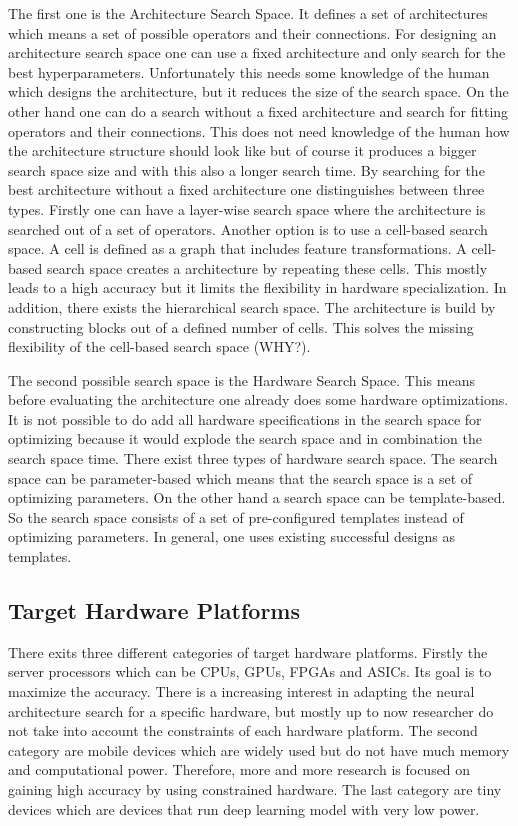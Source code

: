 \documentclass[conference]{IEEEtran}
\begin{document}
The first one is the Architecture Search Space. It defines a set of architectures which means a set of possible operators and their connections. For designing an architecture search space one can use a fixed architecture and only search for the best hyperparameters. Unfortunately this needs some knowledge of the human which designs the architecture, but it reduces the size of the search space. On the other hand one can do a search without a fixed architecture and search for fitting operators and their connections. This does not need knowledge of the human how the architecture structure should look like but of course it produces a bigger search space size and with this also a longer search time. By searching for the best architecture without a fixed architecture one distinguishes between three types. Firstly one can have a layer-wise search space where the architecture is searched out of a set of operators. Another option is to use a cell-based search space. A cell is defined as a graph that includes feature transformations. A cell-based search space creates a architecture by repeating these cells. This mostly leads to a high accuracy but it limits the flexibility in hardware specialization. In addition, there exists the hierarchical search space. The architecture is build by constructing blocks out of a defined number of cells. This solves the missing flexibility of the cell-based search space (WHY?). 

The second possible search space is the Hardware Search Space. This means before evaluating the architecture one already does some hardware optimizations. It is not possible to do add all hardware specifications in the search space for optimizing because it would explode the search space and in combination the search space time. There exist three types of hardware search space. The search space can be parameter-based which means that the search space is a set of optimizing parameters. On the other hand a search space can be template-based. So the search space consists of a set of pre-configured templates instead of optimizing parameters. In general, one uses existing successful designs as templates.

\subsection{Target Hardware Platforms}
There exits three different categories of target hardware platforms. Firstly the server processors which can be CPUs, GPUs, FPGAs and ASICs. Its goal is to maximize the accuracy. There is a increasing interest in adapting the neural architecture search for a specific hardware, but mostly up to now researcher do not take into account the constraints of each hardware platform. The second category are mobile devices which are widely used but do not have much memory and computational power. Therefore, more and more research is focused on gaining high accuracy by using constrained hardware. The last category are tiny devices which are devices that run deep learning model with very low power.
\end{document}
